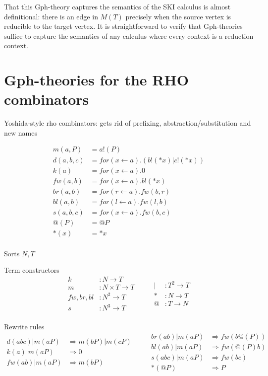 \documentclass{llncs}
\begin{document}
That this Gph-theory captures the semantics of the SKI calculus is almost definitional: there is an edge in $M(T)$ precisely when the source vertex is reducible to the target vertex.  It is straightforward to verify that Gph-theories suffice to capture the semantics of any calculus where every context is a reduction context.

\section{Gph-theories for the RHO combinators}
Yoshida-style rho combinators: gets rid of prefixing,
abstraction/substitution and new names

\[\begin{array}{rl}
  m(a,P) &= a!(P) \\
  d(a,b,c) &= for(x \leftarrow a).(b!(*x) | c!(*x)) \\
  k(a) &= for(x \leftarrow a).0 \\ 
  fw(a,b) &= for(x \leftarrow a).b!(*x) \\
  br(a,b) &= for(r \leftarrow a).fw(b,r) \\
  bl(a,b) &= for(l \leftarrow a).fw(l,b) \\
  s(a,b,c) &= for(x \leftarrow a).fw(b,c) \\
  @(P) &= @P \\
  *(x) &= *x \\  
\end{array}\]

Sorts $N, T$

Term constructors
\[\begin{array}{rl}
  k &: N \to T \\
  m &: N \times T \to T \\
  fw,br,bl &: N^2 \to T \\
  s &: N^3 \to T \\
\end{array} \quad \quad
\begin{array}{rl}
  | &: T^2 \to T \\
  * &: N \to T \\
  @ &: T \to N \\
\end{array}\]

Rewrite rules
\[\begin{array}{rl}
  d(abc) | m(aP) & \Rightarrow m(bP) | m(cP) \\
  k(a) | m(aP) & \Rightarrow 0 \\
  fw(ab) | m(aP) & \Rightarrow m(bP) \\
\end{array} \quad \quad
\begin{array}{rl}
  br(ab) | m(aP) & \Rightarrow fw(b@(P)) \\
  bl(ab) | m(aP) & \Rightarrow fw(@(P)b) \\
  s(abc) | m(aP) & \Rightarrow fw(bc) \\
  *(@P) & \Rightarrow P \\
\end{array}\]
\end{document}
